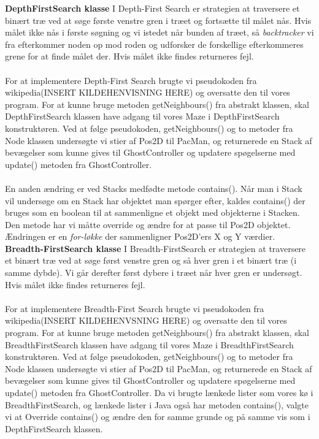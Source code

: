 \documentclass{article}
\theoremstyle{mytheoremstyle}
\theoremstyle{mytheoremstyle}
\theoremstyle{myproblemstyle}
\begin{document}
\textbf{DepthFirstSearch klasse }
I Depth-First Search er strategien at traversere et binært træ ved at søge første venstre gren i træet og fortsætte til målet nås. 
Hvis målet ikke nås i første søgning og vi istedet når bunden af træet, så \textit{backtracker} vi fra efterkommer noden op mod roden og udforsker de forskellige efterkommeres grene for at finde målet der. 
Hvis målet ikke findes returneres fejl.\\ 
\\ 
For at implementere Depth-First Search brugte vi pseudokoden fra wikipedia(INSERT KILDEHENVISNING HERE) og oversatte den til vores program. 
For at kunne bruge metoden getNeighbours() fra abstrakt klassen, skal DepthFirstSearch klassen have adgang til vores Maze i DepthFirstSearch konstruktøren. 
Ved at følge pseudokoden, getNeighbours() og to metoder fra Node klassen undersøgte vi stier af Pos2D til PacMan, og returnerede en Stack af bevægelser som kunne gives til GhostController og updatere spøgelserne med update() metoden fra GhostController.\\ 
\\ 
En anden ændring er ved Stacks medfødte metode contains(). 
Når man i Stack vil undersøge om en Stack har objektet man spørger efter, kaldes contains() der bruges som en boolean til at sammenligne et objekt med objekterne i Stacken. 
Den metode har vi måtte override og ændre for at passe til Pos2D objektet. 
Ændringen er en \textit{for-løkke} der sammenligner Pos2D'ers X og Y værdier.
\\
\textbf{Breadth-FirstSearch klasse} 
I Breadth-FirstSearch er strategien at traversere et binært træ ved at søge først venstre gren og så hver gren i et binært træ (i samme dybde). 
Vi går derefter først dybere i træet når hver gren er undersøgt. Hvis målet ikke findes returneres fejl.\\
\\
For at implementere Breadth-First Search brugte vi pseudokoden fra wikipedia(INSERT KILDEHENVSNING HERE) og oversatte den til vores program. 
For at kunne bruge metoden getNeighbours() fra abstrakt klassen, skal BreadthFirstSearch klassen have adgang til vores Maze i BreadthFirstSearch konstruktøren. 
Ved at følge pseudokoden, getNeighbours() og to metoder fra Node klassen undersøgte vi stier af Pos2D til PacMan, 
og returnerede en Stack af bevægelser som kunne gives til GhostController og updatere spøgelserne med update() metoden fra GhostController. 
Da vi brugte lænkede lister som vores kø i BreadthFirstSearch, 
og lænkede lister i Java også har metoden contains(),  valgte vi at Override contains() og ændre den for samme grunde og på samme vis som i DepthFirstSearch klassen.
\end{document}
